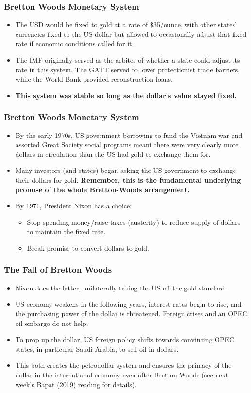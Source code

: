 \documentclass[handout]{beamer}
\begin{document}
\begin{frame} 
	\frametitle{\LARGE{Bretton Woods Monetary System}}
	\begin{itemize}
		\item The USD would be fixed to gold at a rate of \$35/ounce, with other states' currencies fixed to the US dollar but allowed to occasionally adjust that fixed rate if economic conditions called for it. \pause
		\item The IMF originally served as the arbiter of whether a state could adjust its rate in this system. The GATT served to lower protectionist trade barriers, while the World Bank provided reconstruction loans. \pause
		\item \textbf{This system was stable so long as the dollar's value stayed fixed.}
	\end{itemize}
\end{frame}

\begin{frame} 
	\frametitle{\LARGE{Bretton Woods Monetary System}}
	\begin{itemize}
		\item By the early 1970s, US government borrowing to fund the Vietnam war and assorted Great Society social programs meant there were very clearly more dollars in circulation than the US had gold to exchange them for. \pause
		\item Many investors (and states) began asking the US government to exchange their dollars for gold. \textbf{Remember, this is the fundamental underlying promise of the whole Bretton-Woods arrangement.} \pause
		\item By 1971, President Nixon has a choice:
		\begin{itemize}
			\item Stop spending money/raise taxes (austerity) to reduce supply of dollars to maintain the fixed rate.
			\item Break promise to convert dollars to gold.
		\end{itemize}		
	\end{itemize}
\end{frame}

\begin{frame} 
	\frametitle{\LARGE{The Fall of Bretton Woods}}
	\begin{itemize}
		\item Nixon does the latter, unilaterally taking the US off the gold standard. \pause
		\item US economy weakens in the following years, interest rates begin to rise, and the purchasing power of the dollar is threatened. Foreign crises and an OPEC oil embargo do not help. \pause
		\item To prop up the dollar, US foreign policy shifts towards convincing OPEC states, in particular Saudi Arabia, to sell oil in dollars.	\pause
		\item This both creates the petrodollar system and ensures the primacy of the dollar in the international economy even after Bretton-Woods (see next week's Bapat (2019) reading for details). 
	\end{itemize}
\end{frame}
\end{document}
